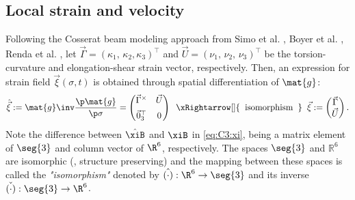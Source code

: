 \subsection{Local strain and velocity}
Following the Cosserat beam modeling approach from Simo et al. \cite{Simo1986}, Boyer et al. \cite{Boyer2021}, Renda et al. \cite{Renda2018,Renda2020}, let $\vec{\Gamma} = (\kappa_1,\, \kappa_2, \kappa_3)^\top$ and $\vec{U} = (\nu_1,\, \nu_2,\, \nu_3)^\top$ be the torsion-curvature and elongation-shear strain vector, respectively. Then, an expression for strain field $\vec{\xi}(\sigma,t)$ is obtained through spatial differentiation of $\mat{g}$:
%
\begin{equation}
\hat{\vec{\xi}} := \mat{g}\inv \frac{\p \mat{g}}{\p \sigma} = \begin{pmatrix} \vec{\Gamma}^\times & \vec{U} \\[0.5em] \vec{0}_3^\top & 0 \end{pmatrix} \;\; \xRightarrow[]{\textrm{\;\;isomorphism\;\;}} \;\; \vec{\xi} := \begin{pmatrix} \vec{\Gamma} \\ \vec{U} \end{pmatrix}.
\label{eq:C3:xi}
\end{equation}
%
Note the difference between $\hat{\xiB}$ and $\xiB$ in \eqref{eq:C3:xi}, being a matrix element of $\seg{3}$ and column vector of $\R^6$, respectively. The spaces $\seg{3}$ and $\mathbb{R}^6$ are isomorphic (\ie, structure preserving) and the mapping between these spaces is called the \emph{"isomorphism"} denoted by $\hat{(\cdot)}: \R^6 \to \seg{3}$ and its inverse $\check{(\cdot)}: \seg{3} \to \R^6$. 

